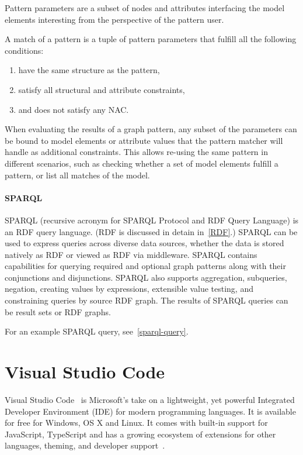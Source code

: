 Pattern parameters are a subset of nodes and attributes interfacing the
model elements interesting from the perspective of the pattern user.

A match of a pattern is a tuple of pattern parameters that fulfill all the following conditions:

\begin{enumerate}
	\item have the same structure as the pattern,
	\item satisfy all structural and attribute constraints,
	\item and does not satisfy any NAC.
\end{enumerate}

When evaluating the results of a graph pattern, any subset of the parameters
can be bound to model elements or attribute values that the pattern matcher
will handle as additional constraints. This allows re-using the same pattern
in different scenarios, such as checking whether a set of model elements
fulfill a pattern, or list all matches of the model.

\paragraph{SPARQL}
\label{sect:sparql}
SPARQL (recursive acronym for SPARQL Protocol and RDF Query Language) is an RDF query language. (RDF is discussed in detain in~\ref{RDF}.) SPARQL can be used to express queries across diverse data sources, whether the data is stored natively as RDF or viewed as RDF via middleware. SPARQL contains capabilities for querying required and optional graph patterns along with their conjunctions and disjunctions. SPARQL also supports aggregation, subqueries, negation, creating values by expressions, extensible value testing, and constraining queries by source RDF graph. The results of SPARQL queries can be result sets or RDF graphs.~\cite{W3C-SPARQL,Harris:13:SQL}

For an example SPARQL query, see~\ref{sparql-query}.

\section{Visual Studio Code}
Visual Studio Code~\cite{vscode} is Microsoft's take on a lightweight, yet powerful Integrated Developer Environment (IDE) for modern programming languages. It is available for free for Windows, OS X and Linux. It comes with built-in support for JavaScript, TypeScript and has a growing ecosystem of extensions for other languages, theming, and developer support~\cite{vscode-extensions}.

